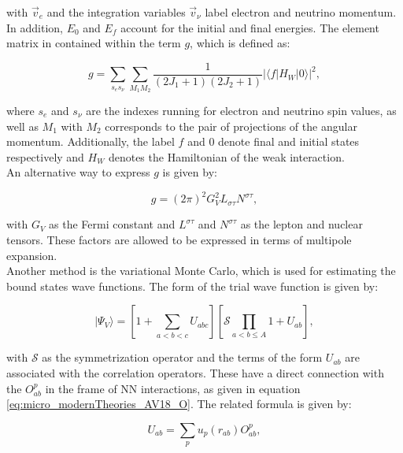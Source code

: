 \documentclass[openany]{book}
\begin{document}
with $\vec v_e$ and the integration variables $\vec v_\nu$ label electron and neutrino momentum.   In addition, $E_0$ and $E_f$ account for the initial and final energies. The element matrix in contained within the term $g$, which is defined as:

\begin{equation}\label{eq:micro_modernTheories_weak_crossSection_g}
	g = \sum_{s_e s_\nu} \sum_{M_1 M_2} {\frac{1}{(2J_1 + 1)(2J_2 + 1)}|\langle f | H_{W} |0 \rangle|^2 },
\end{equation}

where $s_e$ and $s_\nu$ are the indexes running for electron and neutrino spin values, as well as $M_1$ with $M_2$ corresponds to the pair of projections of the angular momentum. Additionally, the label $f$ and $0$ denote final and initial states respectively and $H_W$ denotes the Hamiltonian of the weak interaction. \\

An alternative way to express $g$ is given by:

\begin{equation}\label{eq:micro_modernTheories_weak_crossSection_g_alternative}
	g = (2\pi)^2 G^{2}_V L_{\sigma \tau} N^{\sigma \tau},
\end{equation}

with $G_V$ as the Fermi constant and $L^{\sigma \tau}$ and $N^{\sigma \tau}$ as the lepton and nuclear tensors. These factors are allowed to be expressed in terms of multipole expansion. \\

Another method is the variational Monte Carlo, which is used for estimating the bound states wave functions. The form of the trial wave function is given by:

\begin{equation}\label{eq:micro_modernTheories_variationalMonteCarlo}
	| \Psi_V \rangle = \left[ 1 + \sum_{a < b < c} U_{abc}\right]  \left[ \mathcal{S}  \prod_{a < b \le A } {1 + U_{ab}}\right],
\end{equation}

with $\mathcal{S}$ as the symmetrization operator and the terms of the form $U_{ab}$ are associated with the correlation operators. These have a direct connection with the $O^{p}_{ab}$ in the frame of NN interactions, as given in equation \ref{eq:micro_modernTheories_AV18_O}. The related formula is given by:

\begin{equation}\label{eq:micro_modernTheories_variationalMonteCarlo_correlation}
	U_{ab} = \sum_{p} u_{p}(r_{ab}) O^{p}_{ab},
\end{equation}
\end{document}
